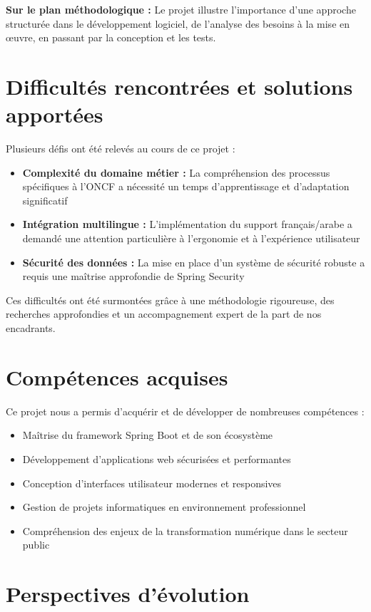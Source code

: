 \textbf{Sur le plan méthodologique :} Le projet illustre l'importance d'une approche structurée dans le développement logiciel, de l'analyse des besoins à la mise en œuvre, en passant par la conception et les tests.

\section*{Difficultés rencontrées et solutions apportées}

Plusieurs défis ont été relevés au cours de ce projet :
\begin{itemize}
    \item \textbf{Complexité du domaine métier :} La compréhension des processus spécifiques à l'ONCF a nécessité un temps d'apprentissage et d'adaptation significatif
    \item \textbf{Intégration multilingue :} L'implémentation du support français/arabe a demandé une attention particulière à l'ergonomie et à l'expérience utilisateur
    \item \textbf{Sécurité des données :} La mise en place d'un système de sécurité robuste a requis une maîtrise approfondie de Spring Security
\end{itemize}

Ces difficultés ont été surmontées grâce à une méthodologie rigoureuse, des recherches approfondies et un accompagnement expert de la part de nos encadrants.

\section*{Compétences acquises}

Ce projet nous a permis d'acquérir et de développer de nombreuses compétences :
\begin{itemize}
    \item Maîtrise du framework Spring Boot et de son écosystème
    \item Développement d'applications web sécurisées et performantes
    \item Conception d'interfaces utilisateur modernes et responsives
    \item Gestion de projets informatiques en environnement professionnel
    \item Compréhension des enjeux de la transformation numérique dans le secteur public
\end{itemize}

\section*{Perspectives d'évolution}

